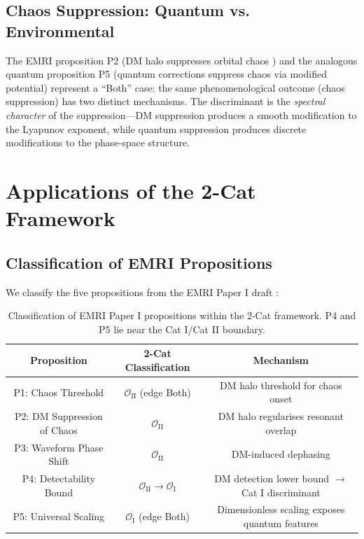 \documentclass[11pt]{article}
\begin{document}
\subsection{Chaos Suppression: Quantum vs. Environmental}

The EMRI proposition P2 (DM halo suppresses orbital chaos \cite{Barausse:2020}) and the analogous quantum proposition P5 (quantum corrections suppress chaos via modified potential) represent a ``Both'' case: the same phenomenological outcome (chaos suppression) has two distinct mechanisms. The discriminant is the \emph{spectral character} of the suppression---DM suppression produces a smooth modification to the Lyapunov exponent, while quantum suppression produces discrete modifications to the phase-space structure.

\section{Applications of the 2-Cat Framework}\label{sec:applications}

\subsection{Classification of EMRI Propositions}

We classify the five propositions from the EMRI Paper I draft \cite{EMRI-Paper-I}:

\begin{table}[h]
\centering
\begin{tabular}{c c c}
\hline\hline
Proposition & 2-Cat Classification & Mechanism \\
\hline
P1: Chaos Threshold & $\mathcal{O}_{\mathrm{II}}$ (edge Both) & DM halo threshold for chaos onset \\
P2: DM Suppression of Chaos & $\mathcal{O}_{\mathrm{II}}$ & DM halo regularises resonant overlap \\
P3: Waveform Phase Shift & $\mathcal{O}_{\mathrm{II}}$ & DM-induced dephasing \\
P4: Detectability Bound & $\mathcal{O}_{\mathrm{II}} \to \mathcal{O}_{\mathrm{I}}$ & DM detection lower bound $\to$ Cat I discriminant \\
P5: Universal Scaling & $\mathcal{O}_{\mathrm{I}}$ (edge Both) & Dimensionless scaling exposes quantum features \\
\hline\hline
\end{tabular}
\caption{Classification of EMRI Paper I propositions within the 2-Cat framework. P4 and P5 lie near the Cat I/Cat II boundary.}
\end{table}
\end{document}
